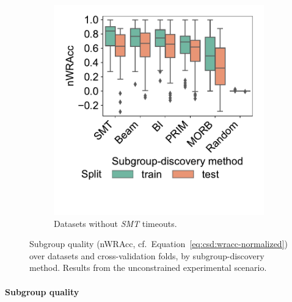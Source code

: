 \documentclass{article}
\theoremstyle{definition}
\begin{document}
\begin{figure}[t]
\begin{subfigure}[t]{0.48\textwidth}
		\includegraphics[width=\textwidth, trim=20 60 15 15, clip]{plots/csd-unconstrained-nwracc-no-timeout-datasets.pdf}
		\caption{Datasets without \emph{SMT} timeouts.}
		\label{fig:csd:unconstrained-nwracc-no-timeout-datasets}
	\end{subfigure}
	\caption{
		Subgroup quality (nWRAcc, cf.~Equation~\ref{eq:csd:wracc-normalized}) over datasets and cross-validation folds, by subgroup-discovery method.
		Results from the unconstrained experimental scenario.
	}
	\label{fig:csd:unconstrained-nwracc}
\end{figure}

\paragraph{Subgroup quality}
\end{document}
